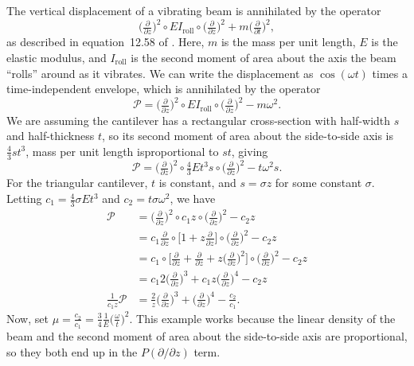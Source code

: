 \documentclass{article}
\theoremstyle{definition}
\theoremstyle{plain}
\newenvironment{verify}{\color{ForestGreen}}{\color{black}}
\begin{document}
\begin{verify}
The vertical displacement of a vibrating beam is annihilated by the operator
\[ \big(\tfrac{\partial}{\partial z}\big)^2 \circ EI_\text{roll} \circ \big(\tfrac{\partial}{\partial z}\big)^2 + m \big(\tfrac{\partial}{\partial t}\big)^2, \]
as described in equation~12.58 of \cite{genta2009vibration}. Here, $m$ is the mass per unit length, $E$ is the elastic modulus, and $I_\text{roll}$ is the second moment of area about the axis the beam ``rolls'' around as it vibrates. We can write the displacement as $\cos(\omega t)$ times a time-independent envelope, which is annihilated by the operator
\[ \mathcal{P} = \big(\tfrac{\partial}{\partial z}\big)^2 \circ EI_\text{roll} \circ \big(\tfrac{\partial}{\partial z}\big)^2 - m\omega^2. \]
We are assuming the cantilever has a rectangular cross-section with half-width $s$ and half-thickness $t$, so its second moment of area about the side-to-side axis is $\tfrac{4}{3}st^3$, mass per unit length isproportional to $st$, giving
\[ \mathcal{P} = \big(\tfrac{\partial}{\partial z}\big)^2 \circ \tfrac{4}{3}Et^3 s \circ \big(\tfrac{\partial}{\partial z}\big)^2 - t\omega^2 s. \]
For the triangular cantilever, $t$ is constant, and $s = \sigma z$ for some constant $\sigma$. Letting $c_1 = \tfrac{4}{3}\sigma Et^3$ and $c_2 = t\sigma\omega^2$, we have
\begin{align*}
\mathcal{P} & = \big(\tfrac{\partial}{\partial z}\big)^2 \circ c_1 z \circ \big(\tfrac{\partial}{\partial z}\big)^2 - c_2 z \\
& = c_1 \tfrac{\partial}{\partial z} \circ \big[ 1 + z \tfrac{\partial}{\partial z} \big] \circ \big(\tfrac{\partial}{\partial z}\big)^2 - c_2 z \\
& = c_1 \circ \big[ \tfrac{\partial}{\partial z} + \tfrac{\partial}{\partial z} + z \big(\tfrac{\partial}{\partial z}\big)^2 \big] \circ \big(\tfrac{\partial}{\partial z}\big)^2 - c_2 z \\
& = c_1 2\big(\tfrac{\partial}{\partial z}\big)^3 + c_1 z \big(\tfrac{\partial}{\partial z}\big)^4 - c_2 z \\
\tfrac{1}{c_1 z} \mathcal{P} & = \tfrac{2}{z} \big(\tfrac{\partial}{\partial z}\big)^3 + \big(\tfrac{\partial}{\partial z}\big)^4 - \tfrac{c_2}{c_1}.
\end{align*}
Now, set $\mu = \tfrac{c_2}{c_1} = \tfrac{3}{4} \tfrac{1}{E} \big(\tfrac{\omega}{t}\big)^2$. This example works because the linear density of the beam and the second moment of area about the side-to-side axis are proportional, so they both end up in the $P(\partial/\partial z)$ term.\par
\end{verify}
\color{black}
\end{document}
